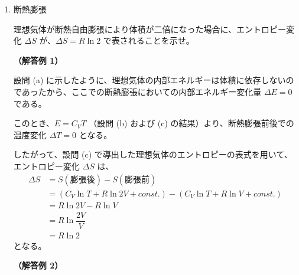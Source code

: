 \documentclass[uplatex,dvipdfmx,a4paper,11pt]{jsarticle}
\newcommand{\diff}{\mathrm d}
\begin{document}
\begin{appendix}
\begin{enumerate}
\begin{enumerate}
{\bf （解答例）}

前問題の結果より、定積モル比熱は体積には依存しないので、定義式 $C_V = \dfrac{1}{n} \left( \dfrac{\partial E}{\partial T} \right)_V$ を積分して、
\begin{align*}
E= C_V T + const.
\end{align*}
である。
この関係と理想気体の状態方程式 $PV = RT$ を、熱力学第一法則の保存式に用いて、
\begin{align*}
\diff E &= d' Q − P \diff V　\\
\therefore \quad d' Q 
	&= \diff E + P \diff V \\
	&= C_V \diff T + RT \dfrac{\diff V}{V}
\end{align*}
を得る。
これを、エントロピー（変化）の定義に代入して、
\begin{align*}
dS 
	&= \dfrac{d' Q}{T} \\
	&= C_V \dfrac{\diff T}{T} + R \dfrac{\diff V}{V}
\end{align*}

両辺を積分することで、理想気体のエントロピーの表式として、
\begin{align*}
S = C_V \ln T + R \ln V + const.
\end{align*}
を得る。


\item
断熱膨張

理想気体が断熱自由膨張により体積が二倍になった場合に、エントロピー変化 $\Delta S$ が、$\Delta S = R \ln 2$ で表されることを示せ。

{\bf （解答例 1）}

設問 (a) に示したように、理想気体の内部エネルギーは体積に依存しないのであったから、ここでの断熱膨張においての内部エネルギー変化量 $\Delta E = 0$ である。

このとき、$E = C_V T$ （設問 (b) および (c) の結果）より、断熱膨張前後での温度変化 $\Delta T =0$ となる。

したがって、設問 (c) で導出した理想気体のエントロピーの表式を用いて、エントロピー変化 $\Delta S$ は、
\begin{align*}
\Delta S 
	&= S(\text{膨張後}) - S(\text{膨張前}) \\
	&= (C_V \ln T + R \ln 2V + const.) - (C_V \ln T + R \ln V + const.) \\
	&= R \ln 2V - R \ln V \\
	&= R \ln \dfrac{2V}{V} \\
	&= R \ln 2
\end{align*}
となる。

{\bf （解答例 2）}


\end{enumerate}
\end{enumerate}
\end{appendix}
\end{document}
